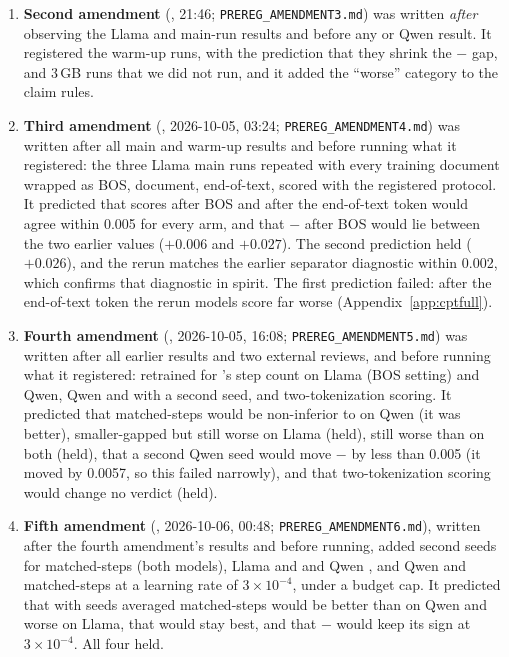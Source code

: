 \begin{enumerate}
  \item \textbf{Second amendment} (\commitD{}, 21:46; \texttt{PREREG\_AMENDMENT3.md}) was written \emph{after} observing the Llama \RO{} and \RII{} main-run results and before any \RI{} or Qwen result. It registered the warm-up runs, with the prediction that they shrink the \RII{} $-$ \RO{} gap, and 3\,GB runs that we did not run, and it added the ``worse'' category to the claim rules.
  \item \textbf{Third amendment} (\commitE{}, 2026-10-05, 03:24; \texttt{PREREG\_AMENDMENT4.md}) was written after all main and warm-up results and before running what it registered: the three Llama main runs repeated with every training document wrapped as BOS, document, end-of-text, scored with the registered protocol. It predicted that scores after BOS and after the end-of-text token would agree within 0.005 for every arm, and that \RII{} $-$ \RI{} after BOS would lie between the two earlier values ($+0.006$ and $+0.027$). The second prediction held ($+0.026$), and the rerun matches the earlier separator diagnostic within 0.002, which confirms that diagnostic in spirit. The first prediction failed: after the end-of-text token the rerun models score far worse (Appendix~\ref{app:cptfull}).
  \item \textbf{Fourth amendment} (\commitF{}, 2026-10-05, 16:08; \texttt{PREREG\_AMENDMENT5.md}) was written after all earlier results and two external reviews, and before running what it registered: \RII{} retrained for \RI{}'s step count on Llama (BOS setting) and Qwen, Qwen \RI{} and \RII{} with a second seed, and two-tokenization scoring. It predicted that matched-steps \RII{} would be non-inferior to \RI{} on Qwen (it was better), smaller-gapped but still worse on Llama (held), still worse than \RO{} on both (held), that a second Qwen seed would move \RII{} $-$ \RI{} by less than 0.005 (it moved by 0.0057, so this failed narrowly), and that two-tokenization scoring would change no verdict (held).
  \item \textbf{Fifth amendment} (\commitG{}, 2026-10-06, 00:48; \texttt{PREREG\_AMENDMENT6.md}), written after the fourth amendment's results and before running, added second seeds for matched-steps \RII{} (both models), Llama \RO{} and \RI{} and Qwen \RO{}, and Qwen \RI{} and matched-steps \RII{} at a learning rate of $3{\times}10^{-4}$, under a budget cap. It predicted that with seeds averaged matched-steps \RII{} would be better than \RI{} on Qwen and worse on Llama, that \RO{} would stay best, and that \RII{} $-$ \RI{} would keep its sign at $3{\times}10^{-4}$. All four held.

\end{enumerate}
